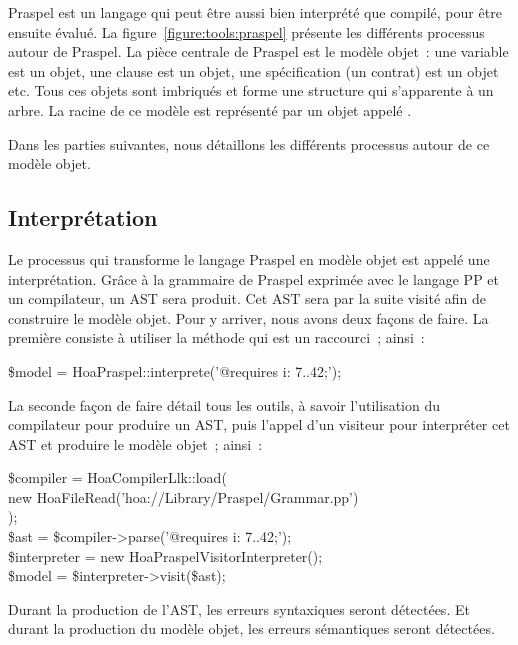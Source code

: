 Praspel est un langage qui peut être aussi bien interprété que compilé, pour
être ensuite évalué. La figure~\ref{figure:tools:praspel} présente les
différents processus autour de Praspel. La pièce centrale de Praspel est le
modèle objet~: une variable est un objet, une clause est un objet, une
spécification (un contrat) est un objet etc. Tous ces objets sont imbriqués et
forme une structure qui s'apparente à un arbre. La racine de ce modèle est
représenté par un objet appelé
.

Dans les parties suivantes, nous détaillons les différents processus autour de
ce modèle objet.

\subsection{Interprétation}
\label{subsection:tools:interpretation}

Le processus qui transforme le langage Praspel en modèle objet est appelé une
interprétation. Grâce à la grammaire de Praspel exprimée avec le langage PP et
un compilateur, un AST sera produit. Cet AST sera par la suite visité afin de
construire le modèle objet. Pour y arriver, nous avons deux façons de faire. La
première consiste à utiliser la méthode 
qui est un raccourci~; ainsi~:
%
\begin{pre}
\$model = Hoa\bslash{}Praspel::interprete('@requires i: 7..42;');
\end{pre}
%
La seconde façon de faire détail tous les outils, à savoir l'utilisation du
compilateur pour produire un AST, puis l'appel d'un visiteur pour interpréter
cet AST et produire le modèle objet~; ainsi~:
%
\begin{pre}
\$compiler    = Hoa\bslash{}Compiler\bslash{}Llk::load( \\
    new Hoa\bslash{}File\bslash{}Read('hoa://Library/Praspel/Grammar.pp') \\
); \\
\$ast         = \$compiler->parse('@requires i: 7..42;'); \\
\$interpreter = new Hoa\bslash{}Praspel\bslash{}Visitor\bslash{}Interpreter(); \\
\$model       = \$interpreter->visit(\$ast);
\end{pre}

Durant la production de l'AST, les erreurs syntaxiques seront détectées. Et
durant la production du modèle objet, les erreurs sémantiques seront détectées.

